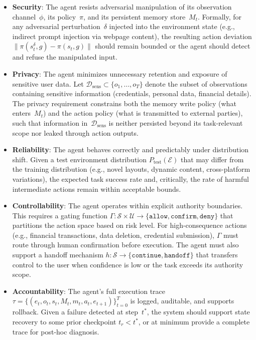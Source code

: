 \begin{itemize}[leftmargin=1.5em]
  \item \textbf{Security}: The agent resists adversarial manipulation of its observation channel~$\phi$, its policy~$\pi$, and its persistent memory store~$M_t$. Formally, for any adversarial perturbation~$\delta$ injected into the environment state (e.g., indirect prompt injection via webpage content), the resulting action deviation $\lVert \pi(s_t^\delta, g) - \pi(s_t, g) \rVert$ should remain bounded or the agent should detect and refuse the manipulated input.

  \item \textbf{Privacy}: The agent minimizes unnecessary retention and exposure of sensitive user data. Let $\mathcal{D}_{\mathrm{sens}} \subset \{o_1, \ldots, o_T\}$ denote the subset of observations containing sensitive information (credentials, personal data, financial details). The privacy requirement constrains both the memory write policy (what enters~$M_t$) and the action policy (what is transmitted to external parties), such that information in~$\mathcal{D}_{\mathrm{sens}}$ is neither persisted beyond its task-relevant scope nor leaked through action outputs.

  \item \textbf{Reliability}: The agent behaves correctly and predictably under distribution shift. Given a test environment distribution $P_{\mathrm{test}}(\mathcal{E})$ that may differ from the training distribution (e.g., novel layouts, dynamic content, cross-platform variations), the expected task success rate and, critically, the rate of harmful intermediate actions remain within acceptable bounds.

  \item \textbf{Controllability}: The agent operates within explicit authority boundaries. This requires a gating function $\Gamma\colon \mathcal{S} \times \mathcal{U} \to \{\texttt{allow}, \texttt{confirm}, \texttt{deny}\}$ that partitions the action space based on risk level. For high-consequence actions (e.g., financial transactions, data deletion, credential submission), $\Gamma$ must route through human confirmation before execution. The agent must also support a handoff mechanism $h\colon \mathcal{S} \to \{\texttt{continue}, \texttt{handoff}\}$ that transfers control to the user when confidence is low or the task exceeds its authority scope.

  \item \textbf{Accountability}: The agent's full execution trace $\tau = \{(e_t, o_t, s_t, M_t, m_t, a_t, e_{t+1})\}_{t=0}^{T}$ is logged, auditable, and supports rollback. Given a failure detected at step~$t^*$, the system should support state recovery to some prior checkpoint $t_r < t^*$, or at minimum provide a complete trace for post-hoc diagnosis.
\end{itemize}

